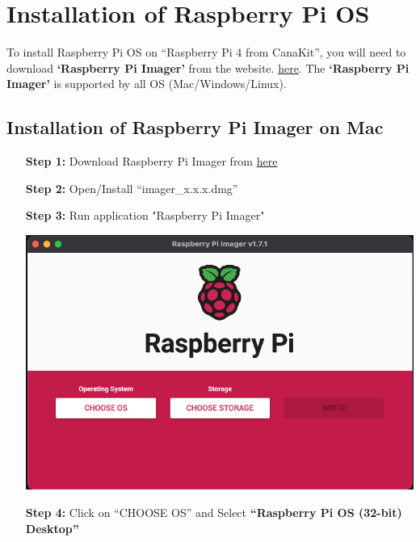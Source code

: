 \section{Installation of Raspberry Pi OS}	\label{sec:run-raspberry}
	To install Raspberry Pi OS on ``Raspberry Pi 4 from CanaKit'', you will need to download \textbf{`Raspberry Pi Imager'} from the website. \href{https://www.raspberrypi.com/software}{here}. The \textbf{`Raspberry Pi Imager'} is supported by all OS (Mac/Windows/Linux). 
	
	\subsection{Installation of Raspberry Pi Imager on Mac}
		\begin{itemize}[leftmargin=1.7cm]
			\item[\textbf{Step 1:}] Download Raspberry Pi Imager from \href{https://downloads.raspberrypi.org/imager/imager_latest.dmg}{here}
			\item[\textbf{Step 2:}] Open/Install ``imager\_x.x.x.dmg''
			\item[\textbf{Step 3:}] Run application "Raspberry Pi Imager"\\
				\begin{minipage}{\textwidth}
					\vspace{2mm}
					\includegraphics[scale=0.29]{Images/raspberry_pi/app.png}
					\vspace{2mm}
				\end{minipage}
			\item[\textbf{Step 4:}] Click on ``CHOOSE OS'' and Select \textbf{``Raspberry Pi OS (32-bit) Desktop''}\\
				\begin{minipage}{\textwidth}

\end{minipage}
\end{itemize}

